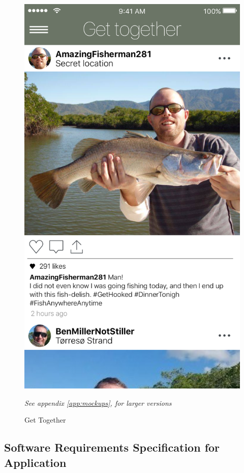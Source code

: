 \begin{figure}[H]
\begin{minipage}{0.5\textwidth}
\begin{minipage}[t]{0.47\textwidth}
  	  	\includegraphics[width=.6\textwidth]{images/Together.png}
  	  	\label{fig:f4}
   		\caption{Get Together}
  	\end{minipage}
	\hfill  	
\end{minipage}

\textit{See appendix \ref{app:mockups}, for larger versions}   
\end{figure}
 
 \columnbreak
\subsection{Software Requirements Specification for Application}


